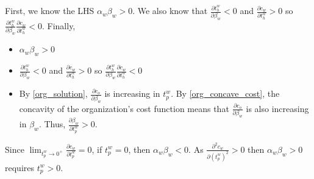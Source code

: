\documentclass[source/paper/main.tex]{subfiles}
\begin{document}
First, we know the LHS $\alpha_w \beta_w>0$. We also know that $\frac{\partial t_h^w}{\partial \beta_w} < 0$ and $\frac{\partial c_w}{\partial t_h^w} >0 $ so $\frac{\partial t_h^w}{\partial \beta_w}\frac{\partial c_w}{\partial t_h^w}<0$. Finally, 

\begin{itemize}
    \item $\alpha_w \beta_w>0$ 
    \item $\frac{\partial t_h^w}{\partial \beta_w} < 0$ and $\frac{\partial c_w}{\partial t_h^w} >0 $ so $\frac{\partial t_h^w}{\partial \beta_w}\frac{\partial c_w}{\partial t_h^w}<0$
    \item By \ref{org_solution}, $\frac{\partial c_o}{\partial \beta_w}$ is increasing in $t_p^w$. By \ref{org_concave_cost}, the concavity of the organization's cost function means that $\frac{\partial c_o}{\partial \beta_w}$ is also increasing in $\beta_w$. Thus, $\frac{\partial \beta_w}{\partial t_p^w} > 0$.
\end{itemize}
Since $\lim_{t_p^w \to 0^+} \frac{\partial c_w}{\partial t_p^w} = 0$, if $t_p^w = 0$, then $\alpha_w\beta_w < 0$. As $\frac{\partial^2 c_w}{\partial (t_p^w)^2}>0$ then $\alpha_w \beta_w>0$ requires $t_p^w>0$. 
\end{document}
